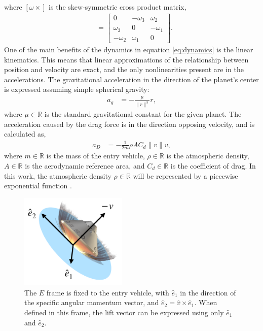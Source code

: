 where $[\omega \times]$ is the skew-symmetric cross product matrix,
\begin{align}
    [\omega \times ] &= \begin{bmatrix} 0 &-\omega_3 &\omega_2 \\ 
                                     \omega_3 &0 & -\omega_1 \\ 
                                     -\omega_2 & \omega_1 & 0 \end{bmatrix}.
\end{align}
One of the main benefits of the dynamics in equation \eqref{eq:dynamics} is the linear kinematics. This means that linear approximations of the relationship between position and velocity are exact, and the only nonlinearities present are in the accelerations. The gravitational acceleration in the direction of the planet's center is expressed assuming simple spherical gravity:
\begin{align}
    a_g &= -\frac{\mu}{\|r\|^3}r,
\end{align}
 where $\mu \in \mathbb{R}$ is the standard gravitational constant for the given planet. The acceleration caused by the drag force is in the direction opposing velocity, and is calculated as,
\begin{align}
    a_D &= - \frac{1}{2m}\rho A C_d \|v\| v,
\end{align}
where $m \in \mathbb{R}$ is the mass of the entry vehicle, $\rho \in \mathbb{R}$ is the atmospheric density, $A \in \mathbb{R}$ is the aerodynamic reference area, and $C_d \in \mathbb{R}$ is the coefficient of drag.  In this work, the atmospheric density $\rho \in \mathbb{R}$ will be represented by a piecewise exponential function \cite{gallais2007}.

\begin{figure}[t]
    \centering
    \includegraphics[width = 2in]{burn.pdf}
    \caption{The $E$ frame is fixed to the entry vehicle, with $\hat{e}_1$ in the direction of the specific angular momentum vector, and $\hat{e}_2 = \hat{v} \times \hat{e}_1$. When defined in this frame, the lift vector can be expressed using only $\hat{e}_1$ and $\hat{e}_2$.}
    \label{fig:eframe}
\end{figure}

